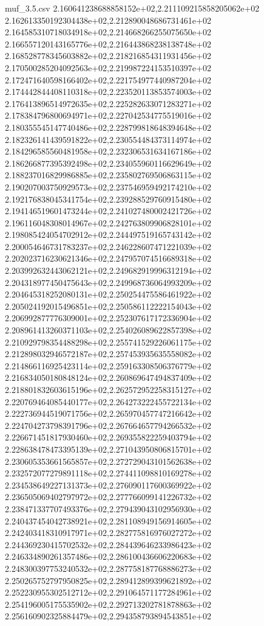 \begin{filecontents*}{muf_3.5.csv}
2.160641238688858152e+02,2.211109215858205062e+02
2.162613350192304438e+02,2.212890048686731461e+02
2.164585310718034918e+02,2.214668266255075650e+02
2.166557120143165776e+02,2.216443868238138748e+02
2.168528778345603882e+02,2.218216854311931456e+02
2.170500285204092563e+02,2.219987224153510397e+02
2.172471640598166402e+02,2.221754977440987204e+02
2.174442844408110318e+02,2.223520113853574003e+02
2.176413896514972635e+02,2.225282633071283271e+02
2.178384796800694971e+02,2.227042534775519016e+02
2.180355545147740486e+02,2.228799818648394648e+02
2.182326141439591822e+02,2.230554484373114974e+02
2.184296585560481958e+02,2.232306531634167186e+02
2.186266877395392498e+02,2.234055960116629649e+02
2.188237016829986885e+02,2.235802769506863115e+02
2.190207003750929573e+02,2.237546959492174210e+02
2.192176838045341754e+02,2.239288529760915480e+02
2.194146519601473244e+02,2.241027480002421726e+02
2.196116048308014967e+02,2.242763809906828101e+02
2.198085424054702912e+02,2.244497519165743142e+02
2.200054646731783237e+02,2.246228607471221039e+02
2.202023716230621346e+02,2.247957074516689318e+02
2.203992632443062121e+02,2.249682919996312194e+02
2.204318977450475643e+02,2.249968736064993209e+02
2.204645318252080131e+02,2.250254475586461922e+02
2.205024192015496851e+02,2.250586112222154043e+02
2.206992877776309001e+02,2.252307617172336904e+02
2.208961413260371103e+02,2.254026089622857398e+02
2.210929798354488298e+02,2.255741529226061175e+02
2.212898032946572187e+02,2.257453935635558082e+02
2.214866116925423114e+02,2.259163308506376779e+02
2.216834050180848124e+02,2.260869647494837409e+02
2.218801832603615196e+02,2.262572952258315127e+02
2.220769464085440177e+02,2.264273222455722134e+02
2.222736944519071756e+02,2.265970457747216642e+02
2.224704273798391796e+02,2.267664657794266532e+02
2.226671451817930460e+02,2.269355822259403794e+02
2.228638478473395139e+02,2.271043950806815701e+02
2.230605353661565857e+02,2.272729043101562638e+02
2.232572077279891118e+02,2.274411098810169278e+02
2.234538649227131373e+02,2.276090117600369922e+02
2.236505069402797972e+02,2.277766099141226732e+02
2.238471337707493376e+02,2.279439043102956930e+02
2.240437454042738921e+02,2.281108949156914605e+02
2.242403418310917971e+02,2.282775816976027272e+02
2.244369230415702532e+02,2.284439646233986423e+02
2.246334890261357486e+02,2.286100436606220683e+02
2.248300397753240532e+02,2.287758187768886273e+02
2.250265752797950825e+02,2.289412899399621892e+02
2.252230955302512712e+02,2.291064571177284961e+02
2.254196005175535902e+02,2.292713202781878863e+02
2.256160902325884479e+02,2.294358793894543851e+02

\end{filecontents*}
